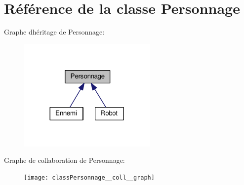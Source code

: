 \hypertarget{classPersonnage}{}\section{Référence de la classe Personnage}
\label{classPersonnage}


Graphe d\textquotesingle{}héritage de Personnage\+:\nopagebreak
\begin{figure}[H]
\begin{center}
\leavevmode
\includegraphics[width=192pt]{classPersonnage__inherit__graph}
\end{center}
\end{figure}


Graphe de collaboration de Personnage\+:
\nopagebreak
\begin{figure}[H]
\begin{center}
\leavevmode
\texttt{[image: classPersonnage\_\_coll\_\_graph]}
\end{center}
\end{figure}
